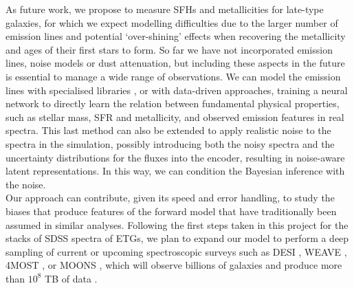 As future work, we propose to measure SFHs and metallicities for late-type galaxies, for which we expect modelling difficulties due to the larger number of emission lines and potential `over-shining' effects when recovering the metallicity and ages of their first stars to form. So far we have not incorporated emission lines, noise models or dust attenuation, but including these aspects in the future is essential to manage a wide range of observations.  We can model the emission lines with specialised libraries \citep[e.g.][]{cloudy,fado}, or with data-driven approaches, training a neural network to  directly learn the relation between fundamental physical properties, such as stellar mass, SFR and metallicity, and observed emission features in real spectra. This last method can  also be extended to apply realistic noise to the spectra in the simulation, possibly introducing both the noisy spectra and the uncertainty distributions for the fluxes into the encoder, resulting in noise-aware latent representations.  In this way, we can condition the Bayesian inference with the noise.\\

Our approach can contribute, given its speed and error handling, to study the biases that produce features of the forward model that have traditionally been assumed in similar analyses. Following the first steps taken in this project for the stacks of SDSS spectra of ETGs, we plan to expand our model to  perform a deep sampling of current or upcoming spectroscopic surveys such as DESI \citep{desi}, WEAVE \citep{weave}, 4MOST \citep{4most}, or MOONS \citep{MOONS}, which will observe billions of galaxies and produce more than $10^8$ TB of data \citep{2023Smith}. 
